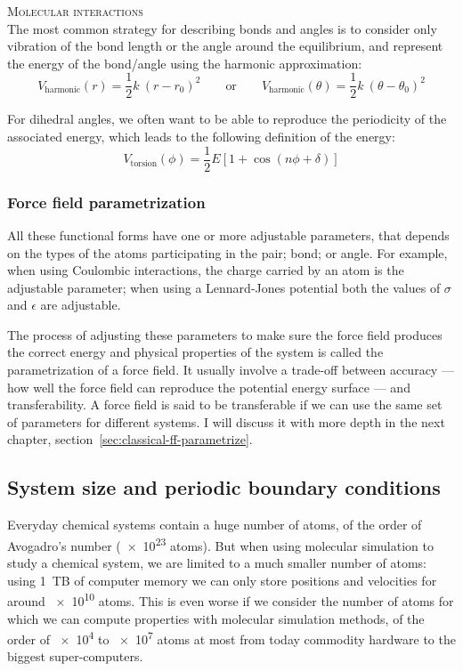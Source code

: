 \documentclass[thesis]{subfiles}
\begin{document}
\textsc{Molecular interactions}\\[0.1\baselineskip]
The most common strategy for describing bonds and angles is to consider only
vibration of the bond length or the angle around the equilibrium, and represent
the energy of the bond/angle using the harmonic approximation:
\[V_\text{harmonic}(r) = \frac 12 k \ (r - r_0)^2 \qquad\text{or}\qquad V_\text{harmonic}(\theta) = \frac 12 k \ (\theta - \theta_0)^2 \]

For dihedral angles, we often want to be able to reproduce the periodicity of
the associated energy, which leads to the following definition of the energy:
\[V_\text{torsion}(\phi) = \frac 12 E \left[1 + \cos(n \phi + \delta)\right] \]

\subsubsection{Force field parametrization}

All these functional forms have one or more adjustable parameters, that depends
on the types of the atoms participating in the pair; bond; or angle. For
example, when using Coulombic interactions, the charge carried by an atom is the
adjustable parameter; when using a Lennard-Jones potential both the values of
$\sigma$ and $\epsilon$ are adjustable.

The process of adjusting these parameters to make sure the force field produces
the correct energy and physical properties of the system is called the
parametrization of a force field. It usually involve a trade-off between
accuracy --- \ie how well the force field can reproduce the potential energy
surface --- and transferability. A force field is said to be transferable if we
can use the same set of parameters for different systems. I will discuss it with
more depth in the next chapter, section~\ref{sec:classical-ff-parametrize}.

\subsection{System size and periodic boundary conditions}
\label{sec:pbc}

Everyday chemical systems contain a huge number of atoms, of the order of
Avogadro's number (\SI{e23}{} atoms). But when using molecular simulation to
study a chemical system, we are limited to a much smaller number of atoms: using
\SI{1}{TB} of computer memory we can only store positions and velocities for
around \SI{e10}{} atoms. This is even worse if we consider the number of atoms
for which we can compute properties with molecular simulation methods, of the
order of \SI{e4}{} to \SI{e7}{} atoms at most from today commodity hardware to
the biggest super-computers.
\end{document}
